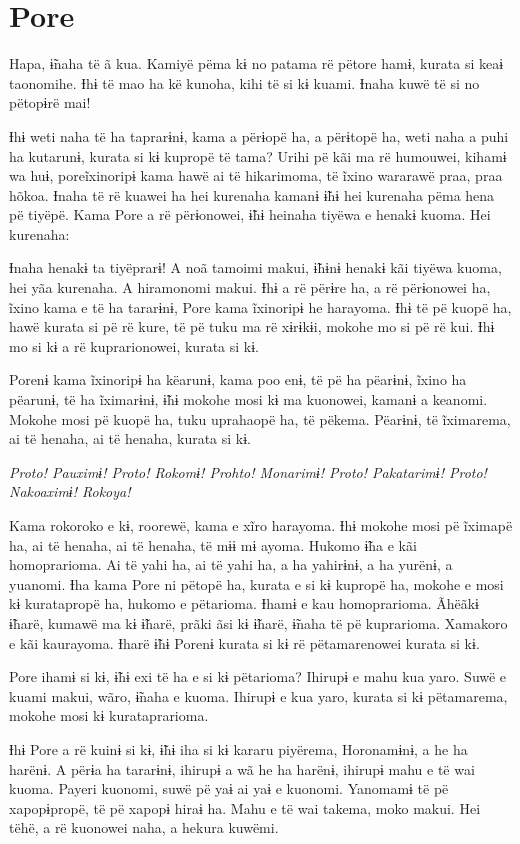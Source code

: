 \chapter{Pore}
 
Hapa, ɨ̃naha të ã kua. Kamiyë pëma kɨ no patama rë pëtore hamɨ, kurata si
keaɨ taonomihe. Ɨhɨ të mao ha kë kunoha, kihi të si kɨ kuami. Ɨnaha kuwë
të si no pëtopɨrë mai! 

Ɨhɨ weti naha të ha taprarɨnɨ, kama a përɨopë ha, a përɨtopë ha, weti
naha a puhi ha kutarunɨ, kurata si kɨ kupropë të tama? Urihi pë kãi ma
rë humouwei, kihamɨ wa huɨ, poreĩxinoripɨ kama hawë ai të hikarimoma, të
ĩxino wararawë praa, praa hõkoa. Ɨnaha të rë kuawei ha hei kurenaha
kamanɨ ɨ̃hɨ hei kurenaha pëma hena pë tiyëpë. Kama Pore a rë përɨonowei,
ɨ̃hɨ heinaha tiyëwa e henakɨ kuoma. Hei kurenaha:

Ɨnaha henakɨ ta tiyëprarɨ! A noã tamoimi makui, ɨ̃hɨnɨ henakɨ kãi tiyëwa
kuoma, hei yãa kurenaha. A hiramonomi makui. Ɨhɨ a rë përɨre ha, a rë
përɨonowei ha, ĩxino kama e të ha tararɨnɨ, Pore kama ĩxinoripɨ he
harayoma. Ɨhɨ të pë kuopë ha, hawë kurata si pë rë kure, të pë tuku ma
rë xɨrɨkɨi, mokohe mo si pë rë kui. Ɨhɨ mo si kɨ a rë kuprarionowei,
kurata si kɨ. 

Porenɨ kama ĩxinoripɨ ha këarunɨ, kama poo enɨ, të pë ha pëarɨnɨ, ĩxino
ha pëarunɨ, të ha ĩximarɨnɨ, ɨ̃hɨ mokohe mosi kɨ ma kuonowei, kamanɨ a
keanomi. Mokohe mosi pë kuopë ha, tuku uprahaopë ha, të pëkema. Pëarɨnɨ,
të ĩximarema, ai të henaha, ai të henaha, kurata si kɨ.

\textit{Proto! Pauximɨ! Proto! Rokomɨ! Prohto! Monarimɨ! Proto! Pakatarimɨ!
Proto! Nakoaximɨ! Rokoya!} 

Kama rokoroko e kɨ, roorewë, kama e xĩro
harayoma. Ɨhɨ mokohe mosi pë ĩximapë ha, ai të henaha, ai të henaha, të
mɨɨ mɨ ayoma. Hukomo ɨ̃ha e kãi homoprarioma. Ai të yahi ha, ai të yahi
ha, a ha yahirɨnɨ, a ha yurënɨ, a yuanomi. Ɨha kama Pore ni pëtopë ha,
kurata e si kɨ kupropë ha, mokohe e mosi kɨ kuratapropë ha, hukomo e
pëtarioma. Ɨhamɨ e kau homoprarioma. Ãhëãkɨ ɨ̃harë, kumawë ma kɨ ɨ̃harë,
prãki ãsi kɨ ɨ̃harë, ɨ̃naha të pë kuprarioma. Xamakoro e kãi kaurayoma.
Ɨharë ɨ̃hɨ Porenɨ kurata si kɨ rë pëtamarenowei kurata si kɨ. 

Pore ihamɨ si kɨ, ɨ̃hɨ exi të ha e si kɨ pëtarioma? Ihirupɨ e mahu kua
yaro. Suwë e kuami makui, wãro, ɨ̃naha e kuoma. Ihirupɨ e kua yaro,
kurata si kɨ pëtamarema, mokohe mosi kɨ kurataprarioma. 

Ɨhɨ Pore a rë kuinɨ si kɨ, ɨ̃hɨ iha si kɨ kararu piyërema, Horonamɨnɨ, a
he ha harënɨ. A përɨa ha tararɨnɨ, ihirupɨ a wã he ha harënɨ, ihirupɨ
mahu e të wai kuoma. Payeri kuonomi, suwë pë yaɨ ai yaɨ e kuonomi.
Yanomamɨ të pë xapopɨpropë, të pë xapopɨ hiraɨ ha. Mahu e të wai takema,
moko makui. Hei tëhë, a rë kuonowei naha, a hekura kuwëmi. 

